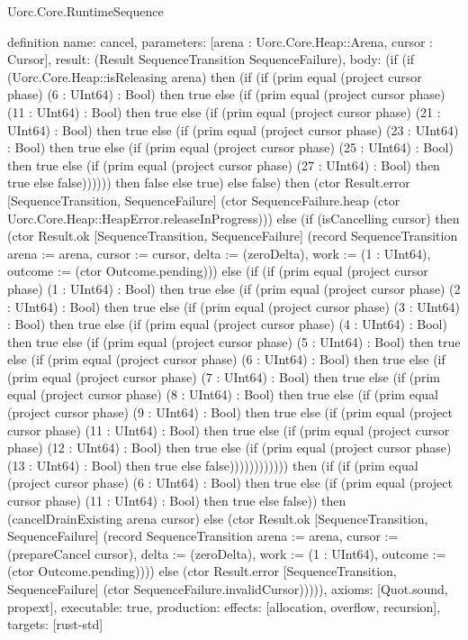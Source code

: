 \begin{lexlean}{Uorc.Core.RuntimeSequence}
\begin{semanticmodule}
definition{
  name: cancel,
  parameters: [arena : Uorc.Core.Heap::Arena, cursor : Cursor],
  result: (Result SequenceTransition SequenceFailure),
  body: (if (if (Uorc.Core.Heap::isReleasing arena) then (if (if (prim equal (project cursor phase) (6 : UInt64) : Bool) then true else (if (prim equal (project cursor phase) (11 : UInt64) : Bool) then true else (if (prim equal (project cursor phase) (21 : UInt64) : Bool) then true else (if (prim equal (project cursor phase) (23 : UInt64) : Bool) then true else (if (prim equal (project cursor phase) (25 : UInt64) : Bool) then true else (if (prim equal (project cursor phase) (27 : UInt64) : Bool) then true else false)))))) then false else true) else false) then (ctor Result.error [SequenceTransition, SequenceFailure] (ctor SequenceFailure.heap (ctor Uorc.Core.Heap::HeapError.releaseInProgress))) else (if (isCancelling cursor) then (ctor Result.ok [SequenceTransition, SequenceFailure] (record SequenceTransition {arena := arena, cursor := cursor, delta := (zeroDelta), work := (1 : UInt64), outcome := (ctor Outcome.pending)})) else (if (if (prim equal (project cursor phase) (1 : UInt64) : Bool) then true else (if (prim equal (project cursor phase) (2 : UInt64) : Bool) then true else (if (prim equal (project cursor phase) (3 : UInt64) : Bool) then true else (if (prim equal (project cursor phase) (4 : UInt64) : Bool) then true else (if (prim equal (project cursor phase) (5 : UInt64) : Bool) then true else (if (prim equal (project cursor phase) (6 : UInt64) : Bool) then true else (if (prim equal (project cursor phase) (7 : UInt64) : Bool) then true else (if (prim equal (project cursor phase) (8 : UInt64) : Bool) then true else (if (prim equal (project cursor phase) (9 : UInt64) : Bool) then true else (if (prim equal (project cursor phase) (11 : UInt64) : Bool) then true else (if (prim equal (project cursor phase) (12 : UInt64) : Bool) then true else (if (prim equal (project cursor phase) (13 : UInt64) : Bool) then true else false)))))))))))) then (if (if (prim equal (project cursor phase) (6 : UInt64) : Bool) then true else (if (prim equal (project cursor phase) (11 : UInt64) : Bool) then true else false)) then (cancelDrainExisting arena cursor) else (ctor Result.ok [SequenceTransition, SequenceFailure] (record SequenceTransition {arena := arena, cursor := (prepareCancel cursor), delta := (zeroDelta), work := (1 : UInt64), outcome := (ctor Outcome.pending)}))) else (ctor Result.error [SequenceTransition, SequenceFailure] (ctor SequenceFailure.invalidCursor))))),
  axioms: [Quot.sound, propext],
  executable: true,
  production: {effects: [allocation, overflow, recursion], targets: [rust-std]}
}
\end{semanticmodule}
\end{lexlean}

